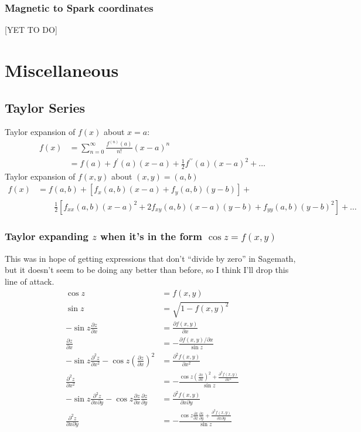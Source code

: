 \documentclass{book}
\newcommand{\pd}[2]{\frac{\partial {#1}}{\partial {#2}}}
\newcommand{\ppd}[2]{\frac{\partial^2{#1}}{\partial {#2}^2}}
\newcommand{\pdpd}[3]{\frac{\partial^2{#1}}{\partial {#2} \partial {#3}}}
\begin{document}
\subsection{Magnetic to Spark coordinates}

[YET TO DO]



\chapter{Miscellaneous}

\section{Taylor Series}

Taylor expansion of $f(x)$ about $x = a$:
\begin{equation}
    \begin{aligned}
        f(x) &= \sum_{n=0}^\infty \frac{f^{(n)}(a)}{n!}(x-a)^n \\
             &= f(a) + f^\prime(a)(x-a) + \frac12 f^{\prime\prime}(a)(x-a)^2 + \dots
    \end{aligned}
\end{equation}
Taylor expansion of $f(x,y)$ about $(x,y) = (a,b)$
\begin{equation}
    \begin{aligned}
        f(x) &= f(a,b) + [f_x(a,b)(x-a) + f_y(a,b)(y-b)] + \\
             &\qquad \frac12 [f_{xx}(a,b)(x-a)^2 + 2f_{xy}(a,b)(x-a)(y-b) + f_{yy}(a,b)(y-b)^2] + \dots
    \end{aligned}
\end{equation}

\subsection{Taylor expanding $z$ when it's in the form $\cos z = f(x,y)$}

This was in hope of getting expressions that don't ``divide by zero'' in Sagemath, but it doesn't seem to be doing any better than before, so I think I'll drop this line of attack.
\begin{equation}
    \begin{aligned}
        \cos z &= f(x,y) \\
        \sin z &= \sqrt{1-f(x,y)^2} \\
        -\sin z \pd{z}{x} &= \pd{f(x,y)}{x} \\
        \pd{z}{x} &= -\frac{\partial f(x,y)/\partial{x}}{\sin z} \\
        -\sin z \ppd{z}{x} - \cos z \left(\pd{z}{x}\right)^2 &= \ppd{f(x,y)}{x} \\
        \ppd{z}{x} &= -\frac{\cos z \left(\pd{z}{x}\right)^2 + \ppd{f(x,y)}{x}}{\sin z} \\
        -\sin z \pdpd{z}{x}{y} - \cos z \pd{z}{x}\pd{z}{y} &= \pdpd{f(x,y)}{x}{y} \\
        \pdpd{z}{x}{y} &= -\frac{\cos z \pd{z}{x}\pd{z}{y} + \pdpd{f(x,y)}{x}{y}}{\sin z}
    \end{aligned}
\end{equation}
\end{document}
